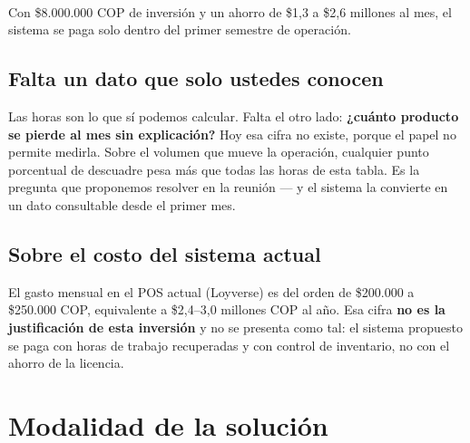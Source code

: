 \documentclass[11pt,a4paper]{article}
\begin{document}
\vspace{6pt}
\noindent{\color{ambar}\rule{\textwidth}{1.5pt}}\\[4pt]
{\small Con \$8.000.000 COP de inversión y un ahorro de \$1,3 a \$2,6 millones al mes,
el sistema se paga solo dentro del primer semestre de operación.}\\[2pt]
\noindent{\color{ambar}\rule{\textwidth}{1.5pt}}

\subsection*{Falta un dato que solo ustedes conocen}

Las horas son lo que sí podemos calcular. Falta el otro lado: \textbf{¿cuánto
producto se pierde al mes sin explicación?} Hoy esa cifra no existe, porque el papel
no permite medirla. Sobre el volumen que mueve la operación, cualquier punto
porcentual de descuadre pesa más que todas las horas de esta tabla. Es la pregunta
que proponemos resolver en la reunión --- y el sistema la convierte en un dato
consultable desde el primer mes.

\subsection*{Sobre el costo del sistema actual}

El gasto mensual en el POS actual (Loyverse) es del orden de \$200.000 a \$250.000
COP, equivalente a \$2,4--3,0 millones COP al año. Esa cifra \textbf{no es la
justificación de esta inversión} y no se presenta como tal: el sistema propuesto se
paga con horas de trabajo recuperadas y con control de inventario, no con el ahorro
de la licencia.

\section{Modalidad de la solución}\label{sec:modalidades}
\end{document}
